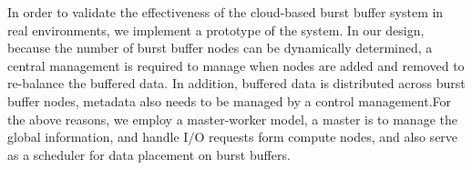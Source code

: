 % 
% 
% 

In order to validate the effectiveness of the cloud-based burst buffer system in
real environments, we implement a prototype of the system.
In our design,
because the number of burst buffer nodes can be dynamically determined, a central management is required to manage when nodes are added and
removed to re-balance the buffered data. In addition, buffered data is
distributed across burst buffer nodes, metadata also needs to be managed by a
control management.For the above reasons, we employ a master-worker model, 
a master is to manage the global information, and handle I/O requests form
compute nodes, and also serve as a scheduler for data placement on burst
buffers.

